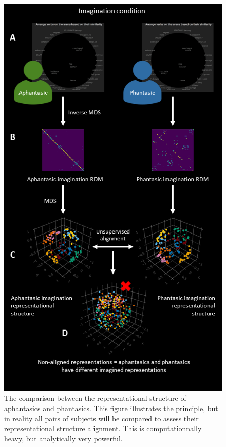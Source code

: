 \documentclass[
  authoryear]{elsarticle}
\begin{document}
\begin{figure}[H]

{\centering \includegraphics{images/my-protocol-2.png}

}

\caption{The comparison between the representational structure of
aphantasics and phantasics. This figure illustrates the principle, but
in reality all pairs of subjects will be compared to assess their
representational structure alignment. This is computationnally heavy,
but analytically very powerful.}

\end{figure}%
\end{document}

